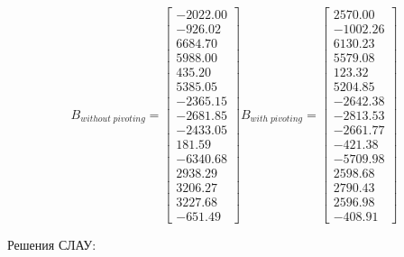 \documentclass[a4paper, 12pt]{article}
\begin{document}
\scriptsize
\[
B_{without\;pivoting} = \left[{\begin{array}{r}
	-2022.00 \\
	-926.02 \\
	6684.70 \\
	5988.00 \\
	435.20 \\
	5385.05 \\
	-2365.15 \\
	-2681.85 \\
	-2433.05 \\
	181.59 \\
	-6340.68 \\
	2938.29 \\
	3206.27 \\
	3227.68 \\
	-651.49
	\end{array}}\right]
B_{with\;pivoting} = \left[{
	\begin{array}{r}
	2570.00 \\
	-1002.26 \\
	6130.23 \\
	5579.08 \\
	123.32 \\
	5204.85 \\
	-2642.38 \\
	-2813.53 \\
	-2661.77 \\ 
	-421.38 \\
	-5709.98 \\
	2598.68 \\
	2790.43 \\
	2596.98 \\
	-408.91
	\end{array}}\right]
\]

\normalsize Решения СЛАУ:
\scriptsize
\end{document}
